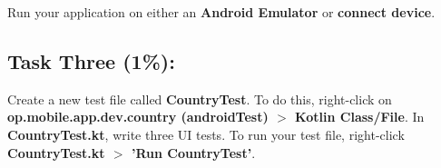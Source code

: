 \documentclass{article}
\begin{document}
Run your application on either an \textbf{Android Emulator} or \textbf{connect device}. \\ 

\subsection*{Task Three (1\%):}
Create a new test file called \textbf{CountryTest}. To do this, right-click on \textbf{op.mobile.app.dev.country (androidTest) $>$ Kotlin Class/File}. In \textbf{CountryTest.kt}, write three UI tests. To run your test file, right-click \textbf{CountryTest.kt $>$ 'Run CountryTest'}.
\end{document}
